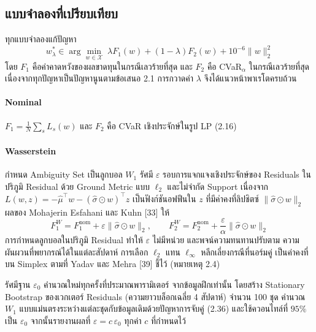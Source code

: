 \subsection{แบบจำลองที่เปรียบเทียบ}

ทุกแบบจำลองแก้ปัญหา
\begin{equation}
w^\ast_\lambda \in \arg\min_{w \in \mathcal{X}} \; \lambda F_1(w) + (1-\lambda) F_2(w) + 10^{-6}\lVert w \rVert_2^2
\label{eq:exp1-ws}
\end{equation}
โดย $F_1$ คือค่าคาดหวังของผลขาดทุนในกรณีเลวร้ายที่สุด และ $F_2$ คือ CVaR$_\alpha$ ในกรณีเลวร้ายที่สุด
เนื่องจากทุกปัญหาเป็นปัญหานูนตามข้อเสนอ 2.1 การกวาดค่า $\lambda$ จึงได้แนวหน้าพาเรโตครบถ้วน

\paragraph{Nominal}
$F_1 = \frac{1}{N}\sum_s L_s(w)$ และ $F_2$ คือ CVaR เชิงประจักษ์ในรูป LP (2.16)

\paragraph{Wasserstein}
กำหนด Ambiguity Set เป็นลูกบอล $W_1$ รัศมี $\varepsilon$ รอบการแจกแจงเชิงประจักษ์ของ Residuals
ในปริภูมิ Residual ด้วย Ground Metric แบบ $\ell_2$ และไม่จำกัด Support เนื่องจาก
$L(w, z) = -\hat\mu^\top w - (\hat\sigma \odot w)^\top z$ เป็นฟังก์ชันอฟฟีนใน $z$ ที่มีค่าคงที่ลิปชิตซ์
$\lVert \hat\sigma \odot w \rVert_2$ ผลของ Mohajerin Esfahani และ Kuhn [33] ให้
\begin{equation}
F_1^{W} = F_1^{\mathrm{nom}} + \varepsilon \lVert \hat\sigma \odot w \rVert_2, \qquad
F_2^{W} = F_2^{\mathrm{nom}} + \frac{\varepsilon}{\alpha} \lVert \hat\sigma \odot w \rVert_2
\label{eq:exp1-wass}
\end{equation}
การกำหนดลูกบอลในปริภูมิ Residual ทำให้ $\varepsilon$ ไม่มีหน่วย และพจน์ความทนทานปรับตาม
ความผันผวนที่พยากรณ์ได้ในแต่ละสัปดาห์ การเลือก $\ell_2$ แทน $\ell_\infty$ หลีกเลี่ยงกรณีที่นอร์มคู่
เป็นค่าคงที่บน Simplex ตามที่ Yadav และ Mehra [39] ชี้ไว้ (หมายเหตุ 2.4)

รัศมีฐาน $\varepsilon_0$ คำนวณใหม่ทุกครั้งที่ประมาณพารามิเตอร์ จากข้อมูลฝึกเท่านั้น โดยสร้าง
Stationary Bootstrap ของเวกเตอร์ Residuals (ความยาวบล็อกเฉลี่ย 4 สัปดาห์) จำนวน 100 ชุด
คำนวณ $W_1$ แบบแม่นตรงระหว่างแต่ละชุดกับข้อมูลเดิมด้วยปัญหาการจับคู่ (2.36) และใช้ควอนไทล์ที่
$95\%$ เป็น $\varepsilon_0$ จากนั้นรายงานผลที่ $\varepsilon = c\,\varepsilon_0$ ทุกค่า $c$ ที่กำหนดไว้

